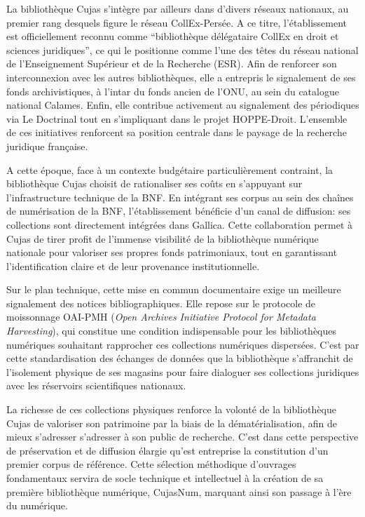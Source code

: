 La bibliothèque Cujas s'intègre par ailleurs dans d'divers réseaux nationaux, au premier rang desquels figure le réseau CollEx-Persée. A ce titre, l'établissement est officiellement reconnu comme \enquote{bibliothèque délégataire CollEx en droit et sciences juridiques}, ce qui le positionne comme l'une des têtes du réseau national de l'Enseignement Supérieur et de la Recherche (ESR). Afin de renforcer son interconnexion avec les autres bibliothèques, elle a entrepris le signalement de ses fonds archivistiques, à l'intar du fonds ancien de l'ONU, au sein du catalogue national Calames. Enfin, elle contribue activement au signalement des périodiques via Le Doctrinal tout en s'impliquant dans le projet HOPPE-Droit. L'ensemble de ces initiatives renforcent sa position centrale dans le paysage de la recherche juridique française.

A cette époque, face à un contexte budgétaire particulièrement contraint, la bibliothèque Cujas choisit de rationaliser ses coûts en s'appuyant sur l'infrastructure technique  de la BNF. En intégrant ses corpus au sein des chaînes de numérisation de la BNF, l'établissement bénéficie d'un canal de diffusion: ses collections sont directement intégrées dans Gallica. Cette collaboration permet à Cujas de tirer profit de l'immense visibilité de la bibliothèque numérique nationale pour valoriser ses propres fonds patrimoniaux, tout en garantissant l'identification claire et de leur provenance institutionnelle.

Sur le plan technique, cette mise en commun documentaire exige un meilleure signalement des notices bibliographiques. Elle repose sur le protocole de moissonnage OAI-PMH (\textit{Open Archives Initiative Protocol for Metadata Harvesting}), qui constitue une condition indispensable pour les bibliothèques numériques souhaitant rapprocher ces collections numériques dispersées. C'est par cette standardisation des échanges de données que la bibliothèque s'affranchit de l'isolement physique de ses magasins pour faire dialoguer ses collections juridiques avec les réservoirs scientifiques nationaux.

La richesse de ces collections physiques renforce la volonté de la bibliothèque Cujas de valoriser son patrimoine par la biais de la dématérialisation, afin de mieux s'adresser s'adresser à son public de recherche. C'est dans cette perspective de préservation et de diffusion élargie qu'est entreprise la constitution d'un premier corpus de référence. Cette sélection méthodique d'ouvrages fondamentaux servira de socle technique et intellectuel à la création de sa première bibliothèque numérique, CujasNum, marquant ainsi son passage à l'ère du numérique.